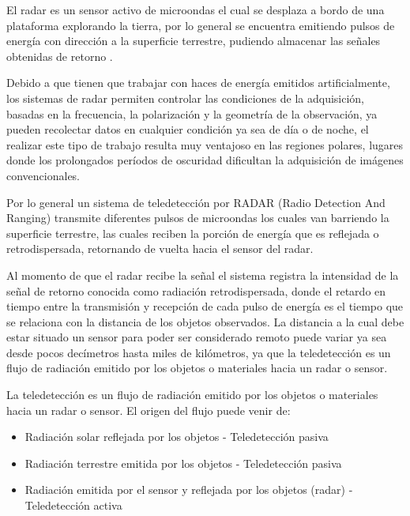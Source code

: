 El radar es un sensor activo de microondas el cual se desplaza a bordo de una plataforma explorando la tierra, por lo general se encuentra emitiendo pulsos de energía con dirección a la superficie terrestre, pudiendo almacenar las señales obtenidas de retorno \cite{Marchionni2014}. 

Debido a que tienen que trabajar con haces de energía emitidos artificialmente, los sistemas de radar permiten controlar las condiciones de la adquisición, basadas en la frecuencia, la polarización y la geometría de la observación, ya pueden recolectar datos en cualquier condición ya sea de día o de noche, el realizar este tipo de trabajo resulta muy ventajoso en las regiones polares, lugares donde los prolongados períodos de oscuridad dificultan la adquisición de imágenes convencionales. 

Por lo general un sistema de teledetección por RADAR (Radio Detection And Ranging) transmite diferentes pulsos de microondas los cuales van barriendo la superficie terrestre, las cuales reciben la porción de energía que es reflejada o retrodispersada, retornando de vuelta hacia el sensor del radar.

Al momento de que el radar recibe la señal el sistema registra la intensidad de la señal de retorno conocida como radiación retrodispersada, donde el retardo en tiempo entre la transmisión y recepción de cada pulso de energía es el tiempo que se relaciona con la distancia de los objetos observados.
La distancia a la cual debe estar situado un sensor para poder ser considerado remoto puede variar ya sea desde pocos decímetros hasta miles de kilómetros, ya que la teledetección es un flujo de radiación emitido por los objetos o materiales hacia un radar o sensor. 

La teledetección es un flujo de radiación emitido por los objetos o materiales hacia un radar o sensor. El origen del flujo puede venir de:

\begin{itemize}
\item Radiación solar reflejada por los objetos - Teledetección pasiva
\item Radiación terrestre emitida por los objetos - Teledetección pasiva
\item Radiación emitida por el sensor y reflejada por los objetos (radar) - Teledetección activa
\end{itemize}


